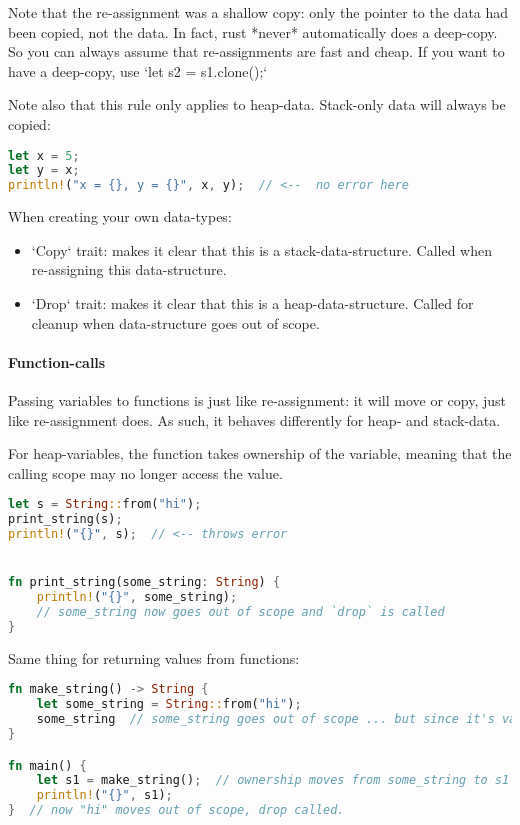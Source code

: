 Note that the re-assignment was a shallow copy: only the pointer to the data had been copied, not the data. In fact, rust *never* automatically does a deep-copy. So you can always assume that re-assignments are fast and cheap. If you want to have a deep-copy, use `let s2 = s1.clone();`

Note also that this rule only applies to heap-data. Stack-only data will always be copied:

\begin{lstlisting}[language=rust]
let x = 5;
let y = x;
println!("x = {}, y = {}", x, y);  // <--  no error here
\end{lstlisting}

When creating your own data-types:
\begin{itemize}
    \item `Copy` trait: makes it clear that this is a stack-data-structure. Called when re-assigning this data-structure.
    \item `Drop` trait: makes it clear that this is a heap-data-structure. Called for cleanup when data-structure goes out of scope.
\end{itemize}

\paragraph{Function-calls}
Passing variables to functions is just like re-assignment: it will move or copy, just like re-assignment does. As such, it behaves differently for heap- and stack-data.

For heap-variables, the function takes ownership of the variable, meaning that the calling scope may no longer access the value.

\begin{lstlisting}[language=rust]
let s = String::from("hi");
print_string(s);
println!("{}", s);  // <-- throws error


fn print_string(some_string: String) {
    println!("{}", some_string);
    // some_string now goes out of scope and `drop` is called
}
\end{lstlisting}

Same thing for returning values from functions:
\begin{lstlisting}[language=rust]
fn make_string() -> String {
    let some_string = String::from("hi");
    some_string  // some_string goes out of scope ... but since it's value is being `move`d, the data is not freed.
}

fn main() {
    let s1 = make_string();  // ownership moves from some_string to s1
    println!("{}", s1);
}  // now "hi" moves out of scope, drop called.
\end{lstlisting}

